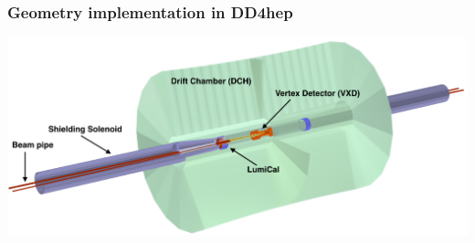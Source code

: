 \documentclass[hyperref={colorlinks=true,pdfpagelabels=false,linkcolor=black}, xcolor=dvipsnames,10pt]{beamer}
\begin{document}
\begin{frame}
	\frametitle{Geometry implementation in DD4hep}
	
	\centering
	\includegraphics[width=\textwidth]{../figures/FCCeeIDEA_IR_description.png}

\end{frame}
\end{document}
